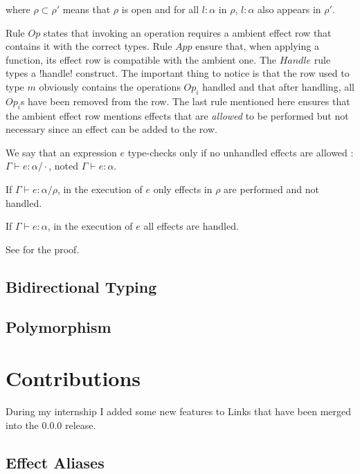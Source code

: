 \documentclass[11pt, nonacm=true, language=french, language=english]{acmart}
\begin{document}
where $\rho \subset \rho'$ means that $\rho$ is open and for all $l:\alpha$ in $\rho$, $l:\alpha$ also appears in $\rho'$.


Rule $Op$ states that invoking an operation requires a ambient effect row that contains it with the correct types. Rule $App$ ensure that, when applying a function, its effect row is compatible with the ambient one. The $Handle$ rule types a !handle! construct. The important thing to notice is that the row used to type $m$ obviously contains the operations $Op_{i}$ handled and that after handling, all $Op_{i}$s have been removed from the row. The last rule mentioned here ensures that the ambient effect row mentions effects that are \emph{allowed} to be performed but not necessary since an effect can be added to the row.

We say that an expression $e$ type-checks only if no unhandled effects are allowed : $\Gamma \vdash e : \alpha / \cdot$, noted $\Gamma \vdash e : \alpha$.


\begin{thm}
  If $\Gamma \vdash e : \alpha / \rho$, in the execution of $e$ only effects in $\rho$ are performed and not handled.
\end{thm}
\begin{cor}
  If $\Gamma \vdash e : \alpha$, in the execution of $e$ all effects are handled.
\end{cor}

See \cite{} for the proof.


\subsection{Bidirectional Typing}

\subsection{Polymorphism}


\section{Contributions}

During my internship I added some new features to Links that have been merged into the 0.0.0 release.

\subsection{Effect Aliases}
\end{document}
